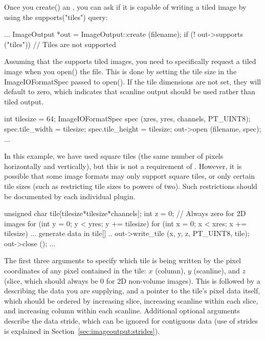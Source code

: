 Once you {\kw create()} an \ImageOutput, you can ask if it is capable
of writing a tiled image by using the {\kw supports("tiles")} query:

\begin{code}
        ...
        ImageOutput *out = ImageOutput::create (filename);
        if (! out->supports ("tiles")) {
            // Tiles are not supported
        }
\end{code}

Assuming that the \ImageOutput supports tiled images, you need to
specifically request a tiled image when you {\kw open()} the file.  This
is done by setting the tile size in the {\kw ImageIOFormatSpec} passed
to {\kw open()}.  If the tile dimensions are not set, they will default
to zero, which indicates that scanline output should be used rather than
tiled output.

\begin{code}
        int tilesize = 64;
        ImageIOFormatSpec spec (xres, yres, channels, PT_UINT8);
        spec.tile_width = tilesize;
        spec.tile_height = tilesize;
        out->open (filename, spec);
        ...
\end{code}

In this example, we have used square tiles (the same number of pixels
horizontally and vertically), but this is not a requirement of \product.
However, it is possible that some image formats may only support square
tiles, or only certain tile sizes (such as restricting tile sizes to
powers of two).  Such restrictions should be documented by each
individual plugin.

\begin{code}
        unsigned char tile[tilesize*tilesize*channels];
        int z = 0;   // Always zero for 2D images
        for (int y = 0;  y < yres;  y += tilesize) {
            for (int x = 0;  x < xres;  x += tilesize) {
                ... generate data in tile[] ..
                out->write_tile (x, y, z, PT_UINT8, tile);
            }
        }
        out->close ();
        ...
\end{code}

The first three arguments to \writetile specify which tile is
being written by the pixel coordinates of any pixel contained in the
tile: $x$ (column), $y$ (scanline), and $z$ (slice, which should always
be 0 for 2D non-volume images).  This is followed by a \ParamBaseType
describing the data you are supplying, and a pointer to the tile's pixel
data itself, which should be ordered by increasing slice, increasing
scanline within each slice, and increasing column within each scanline.
Additional optional arguments describe the data stride, which can be
ignored for contiguous data (use of strides is explained in
Section~\ref{sec:imageoutput:strides}).

